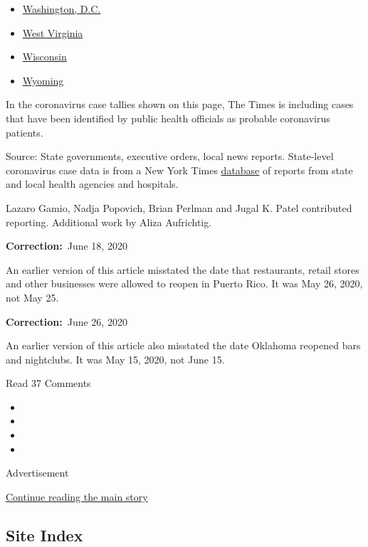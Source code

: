 \begin{itemize}
\item
  \href{https://www.nytimes3xbfgragh.onion/interactive/2020/us/washington-dc-coronavirus-cases.html}{Washington,
  D.C.}
\item
  \href{https://www.nytimes3xbfgragh.onion/interactive/2020/us/west-virginia-coronavirus-cases.html}{West
  Virginia}
\item
  \href{https://www.nytimes3xbfgragh.onion/interactive/2020/us/wisconsin-coronavirus-cases.html}{Wisconsin}
\item
  \href{https://www.nytimes3xbfgragh.onion/interactive/2020/us/wyoming-coronavirus-cases.html}{Wyoming}
\end{itemize}

In the coronavirus case tallies shown on this page, The Times is
including cases that have been identified by public health officials as
probable coronavirus patients.

Source: State governments, executive orders, local news reports.
State-level coronavirus case data is from a New York Times
\href{https://www.nytimes3xbfgragh.onion/interactive/2020/us/coronavirus-us-cases.html}{database}
of reports from state and local health agencies and hospitals.

Lazaro Gamio, Nadja Popovich, Brian Perlman and Jugal K. Patel
contributed reporting. Additional work by Aliza Aufrichtig.

\textbf{Correction:}~June 18, 2020

An earlier version of this article misstated the date that restaurants,
retail stores and other businesses were allowed to reopen in Puerto
Rico. It was May 26, 2020, not May 25.

\textbf{Correction:}~June 26, 2020

An earlier version of this article also misstated the date Oklahoma
reopened bars and nightclubs. It was May 15, 2020, not June 15.

Read 37 Comments

\begin{itemize}
\item
\item
\item
\item
\end{itemize}

Advertisement

\protect\hyperlink{after-bottom}{Continue reading the main story}

\hypertarget{site-index}{%
\subsection{Site Index}\label{site-index}}

